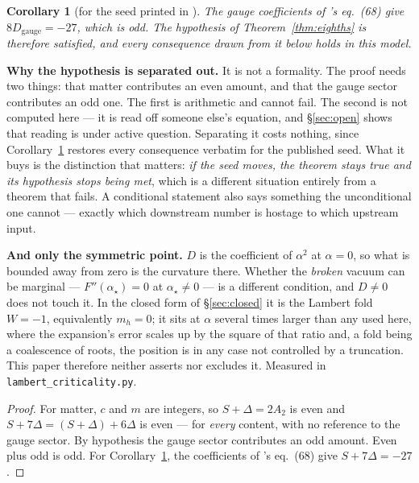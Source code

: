 \documentclass[11pt,a4paper]{article}
\newtheorem{corollary}{Corollary}
\begin{document}
\begin{corollary}[for the seed printed in \cite{KM25}]\label{cor:kmseed}
The gauge coefficients of \cite{KM25}'s eq.~(68) give $8D_{\mathrm{gauge}}=-27$, which is odd. The
hypothesis of Theorem~\ref{thm:eighths} is therefore satisfied, and every consequence drawn from it
below holds in this model.
\end{corollary}

\noindent \textbf{Why the hypothesis is separated out.} It is not a formality. The proof
needs two things: that matter contributes an even amount, and that the gauge sector contributes an
odd one. The first is arithmetic and cannot fail. The second is not computed here --- it is read
off someone else's equation, and \S\ref{sec:open} shows that reading is under active question.
Separating it costs nothing, since Corollary~\ref{cor:kmseed} restores every consequence verbatim
for the published seed. What it buys is the distinction that matters: \emph{if the seed moves, the
theorem stays true and its hypothesis stops being met}, which is a different situation entirely
from a theorem that fails. A conditional statement also says something the unconditional one
cannot --- exactly which downstream number is hostage to which upstream input.

\noindent \textbf{And only the symmetric point.} $D$ is the coefficient of $\alpha^2$ at
$\alpha=0$, so what is bounded away from zero is the curvature there. Whether the \emph{broken}
vacuum can be marginal --- $F''(\alpha_\star)=0$ at $\alpha_\star\neq0$ --- is a different
condition, and $D\neq0$ does not touch it. In the closed form of \S\ref{sec:closed} it is the
Lambert fold $W=-1$, equivalently $m_h=0$; it sits at $\alpha$ several times larger than any used
here, where the expansion's error scales up by the square of that ratio and, a fold being a
coalescence of roots, the position is in any case not controlled by a truncation. This paper
therefore neither asserts nor excludes it. Measured in
\texttt{lambert\_\allowbreak criticality.py}.
\begin{proof}
For matter, $c$ and $m$ are integers, so $S+\Delta=2A_2$ is even and $S+7\Delta=(S+\Delta)+6\Delta$
is even --- for \emph{every} content, with no reference to the gauge sector. By hypothesis the
gauge sector contributes an odd amount. Even plus odd is odd. For
Corollary~\ref{cor:kmseed}, the coefficients of \cite{KM25}'s eq.~(68) give
$S+7\Delta=-27$.
\end{proof}
\end{document}
